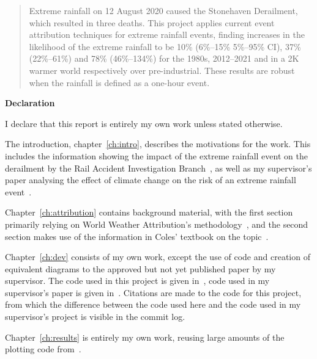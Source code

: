 \documentclass[12pt,a4paper,openany]{report}
\begin{document}
\newpage



\begin{abstract}

Extreme rainfall on 12 August 2020 caused the Stonehaven Derailment,
    which resulted in three deaths.
This project applies current event attribution techniques for extreme rainfall events,
    finding increases in the likelihood of the extreme rainfall to be 10\% (6\%--15\% 5\%--95\% CI),
    37\% (22\%--61\%) and 78\% (46\%--134\%) for the 1980s, 2012--2021 and in a 2K warmer world
    respectively over pre-industrial.
These results are robust when the rainfall is defined as a one-hour event.

\end{abstract}


\begin{center}
\textbf{Declaration}
\end{center}

I declare that this report is entirely my own work unless stated otherwise.

The introduction, chapter~\ref{ch:intro}, describes the motivations for the work.
This includes the information showing the impact of the extreme rainfall event on the derailment by the Rail Accident Investigation Branch~\cite{RAIB_2022},
    as well as my supervisor's paper analysing the effect of climate change on the risk of an extreme rainfall event~\cite{Tett_Soon}.

Chapter~\ref{ch:attribution} contains background material,
    with the first section primarily relying on World Weather Attribution's methodology~\cite{van_Oldenborgh_et_al_2021},
    and the second section makes use of the information in Coles' textbook on the topic~\cite{Coles_2001}.

Chapter~\ref{ch:dev} consists of my own work,
    except the use of code and creation of equivalent diagrams to the approved but not yet published paper by my supervisor.
The code used in this project is given in~\cite{Me_Code},
    code used in my supervisor's paper is given in~\cite{Tett_Code}.
Citations are made to the code for this project,
    from which the difference between the code used here and the code used in my supervisor's project is visible in the commit log.

Chapter~\ref{ch:results} is entirely my own work,
    reusing large amounts of the plotting code from~\cite{Tett_Soon}.
\end{document}

